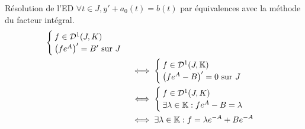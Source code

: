 \documentclass{article}
\begin{document}
\begin{question_kholle}{Résolution de l'ED  $\forall t \in J, y' + a_{0}(t) = b(t)$ par équivalences avec la méthode du facteur intégral.}
\begin{align*}
\begin{cases}
                                                                                                                                   f\in\mathcal{D}^1(J,K) \\
                                                                                                                                   \left(f e^{A}\right)' = B' \text{ sur } J
                                                                                                                                 \end{cases}                                                                                                                          \\
                                                                                                                          & \iff \begin{cases}
                                                                                                                                   f\in\mathcal{D}^1(J,\K) \\
                                                                                                                                   \left(f e^{A}-B\right)' = 0 \text{ sur } J
                                                                                                                                 \end{cases}                                                                                                                         \\
                                                                                                                          & \iff \begin{cases}
                                                                                                                                   f\in\mathcal{D}^{1}(J,K) \\
                                                                                                                                   \exists \lambda\in\K: f e^{A}-B=\lambda
                                                                                                                                 \end{cases}                                                                                                                            \\
                                                                                                                          & \iff \exists \lambda\in\K: f=\lambda e^{-A}+B e^{-A}                                                                                                                   \\

\end{align*}
\end{question_kholle}
\end{document}
